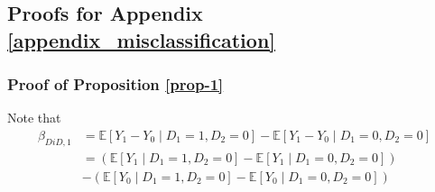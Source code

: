 \documentclass[a4paper,12pt]{article}
\begin{document}
\clearpage

\subsection{Proofs for Appendix \ref{appendix_misclassification}}

\subsubsection{Proof of Proposition \ref{prop-1}}

Note that
\begin{align*}
    \beta_{DiD,1} &= \mathbb{E}[Y_1 - Y_0 \mid D_1=1, D_2=0] - \mathbb{E}[Y_1 - Y_0 \mid D_1=0, D_2=0]\\
    &= (\mathbb{E}[Y_1 \mid D_1=1,D_2=0] - \mathbb{E}[Y_1 \mid D_1=0,D_2=0]) \\ &-  (\mathbb{E}[Y_0 \mid D_1=1,D_2=0] - \mathbb{E}[Y_0 \mid D_1=0,D_2=0])
\end{align*}
\end{document}
